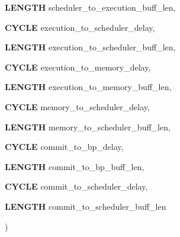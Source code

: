 {{\begin{DoxyParamCaption}
\item[{{\bf LENGTH}}]{scheduler\_\-to\_\-execution\_\-buff\_\-len, }
\item[{{\bf CYCLE}}]{execution\_\-to\_\-scheduler\_\-delay, }
\item[{{\bf LENGTH}}]{execution\_\-to\_\-scheduler\_\-buff\_\-len, }
\item[{{\bf CYCLE}}]{execution\_\-to\_\-memory\_\-delay, }
\item[{{\bf LENGTH}}]{execution\_\-to\_\-memory\_\-buff\_\-len, }
\item[{{\bf CYCLE}}]{memory\_\-to\_\-scheduler\_\-delay, }
\item[{{\bf LENGTH}}]{memory\_\-to\_\-scheduler\_\-buff\_\-len, }
\item[{{\bf CYCLE}}]{commit\_\-to\_\-bp\_\-delay, }
\item[{{\bf LENGTH}}]{commit\_\-to\_\-bp\_\-buff\_\-len, }
\item[{{\bf CYCLE}}]{commit\_\-to\_\-scheduler\_\-delay, }
\item[{{\bf LENGTH}}]{commit\_\-to\_\-scheduler\_\-buff\_\-len}
\end{DoxyParamCaption}
)}}
\label{classo3__sysCore_aa2fc24a24dd599ff3393c62910cbcb06}


